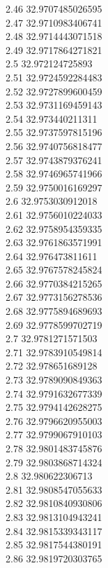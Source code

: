 {2.46	32.9707485026595\\
2.47	32.9710983406741\\
2.48	32.9714443071518\\
2.49	32.9717864271821\\
2.5	32.972124725893\\
2.51	32.9724592284483\\
2.52	32.9727899600459\\
2.53	32.9731169459143\\
2.54	32.973440211311\\
2.55	32.9737597815196\\
2.56	32.9740756818477\\
2.57	32.9743879376241\\
2.58	32.9746965741966\\
2.59	32.9750016169297\\
2.6	32.9753030912018\\
2.61	32.9756010224033\\
2.62	32.9758954359335\\
2.63	32.9761863571991\\
2.64	32.976473811611\\
2.65	32.9767578245824\\
2.66	32.9770384215265\\
2.67	32.9773156278536\\
2.68	32.9775894689693\\
2.69	32.9778599702719\\
2.7	32.9781271571503\\
2.71	32.9783910549814\\
2.72	32.978651689128\\
2.73	32.9789090849363\\
2.74	32.9791632677339\\
2.75	32.9794142628275\\
2.76	32.9796620955003\\
2.77	32.9799067910103\\
2.78	32.9801483745876\\
2.79	32.9803868714324\\
2.8	32.980622306713\\
2.81	32.9808547055633\\
2.82	32.9810840930806\\
2.83	32.9813104943241\\
2.84	32.9815339343117\\
2.85	32.9817544380191\\
2.86	32.9819720303765\\
}
